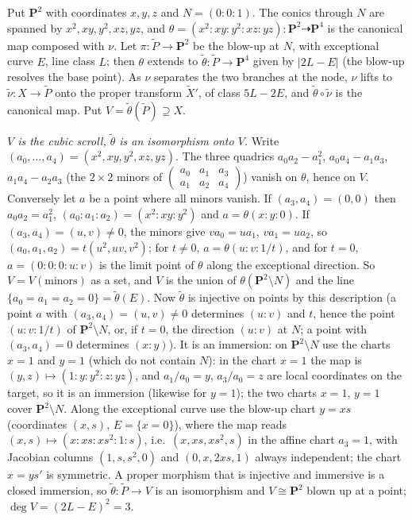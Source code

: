 \documentclass[11pt]{article}
\begin{document}
Put $\mathbf P^2$ with coordinates $x,y,z$ and $N=(0:0:1)$. The conics through $N$ are spanned by $x^2,xy,y^2,xz,yz$, and $\theta=(x^2:xy:y^2:xz:yz):\mathbf P^2\dashrightarrow\mathbf P^4$ is the canonical map composed with $\nu$. Let $\pi:\tilde P\to\mathbf P^2$ be the blow-up at $N$, with exceptional curve $E$, line class $L$; then $\theta$ extends to $\tilde\theta:\tilde P\to\mathbf P^4$ given by $|2L-E|$ (the blow-up resolves the base point). As $\nu$ separates the two branches at the node, $\nu$ lifts to $\tilde\nu:X\to\tilde P$ onto the proper transform $\tilde X'$, of class $5L-2E$, and $\tilde\theta\circ\tilde\nu$ is the canonical map. Put $V=\tilde\theta(\tilde P)\supseteq X$.

\emph{$V$ is the cubic scroll, $\tilde\theta$ is an isomorphism onto $V$.} Write $(a_0,\dots,a_4)=(x^2,xy,y^2,xz,yz)$. The three quadrics $a_0a_2-a_1^2$, $a_0a_4-a_1a_3$, $a_1a_4-a_2a_3$ (the $2\times2$ minors of $\begin{pmatrix}a_0&a_1&a_3\\a_1&a_2&a_4\end{pmatrix}$) vanish on $\theta$, hence on $V$. Conversely let $a$ be a point where all minors vanish. If $(a_3,a_4)=(0,0)$ then $a_0a_2=a_1^2$, $(a_0:a_1:a_2)=(x^2:xy:y^2)$ and $a=\theta(x:y:0)$. If $(a_3,a_4)=(u,v)\ne0$, the minors give $va_0=ua_1$, $va_1=ua_2$, so $(a_0,a_1,a_2)=t(u^2,uv,v^2)$; for $t\ne0$, $a=\theta(u:v:1/t)$, and for $t=0$, $a=(0:0:0:u:v)$ is the limit point of $\theta$ along the exceptional direction. So $V=V(\text{minors})$ as a set, and $V$ is the union of $\theta(\mathbf P^2\setminus N)$ and the line $\{a_0=a_1=a_2=0\}=\tilde\theta(E)$. Now $\tilde\theta$ is injective on points by this description (a point $a$ with $(a_3,a_4)=(u,v)\ne0$ determines $(u:v)$ and $t$, hence the point $(u:v:1/t)$ of $\mathbf P^2\setminus N$, or, if $t=0$, the direction $(u:v)$ at $N$; a point with $(a_3,a_4)=0$ determines $(x:y)$). It is an immersion: on $\mathbf P^2\setminus N$ use the charts $x=1$ and $y=1$ (which do not contain $N$): in the chart $x=1$ the map is $(y,z)\mapsto(1:y:y^2:z:yz)$, and $a_1/a_0=y$, $a_3/a_0=z$ are local coordinates on the target, so it is an immersion (likewise for $y=1$); the two charts $x=1$, $y=1$ cover $\mathbf P^2\setminus N$. Along the exceptional curve use the blow-up chart $y=xs$ (coordinates $(x,s)$, $E=\{x=0\}$), where the map reads $(x,s)\mapsto(x:xs:xs^2:1:s)$, i.e.\ $(x,xs,xs^2,s)$ in the affine chart $a_3=1$, with Jacobian columns $(1,s,s^2,0)$ and $(0,x,2xs,1)$ always independent; the chart $x=ys'$ is symmetric. A proper morphism that is injective and immersive is a closed immersion, so $\tilde\theta:\tilde P\to V$ is an isomorphism and $V\cong\mathbf P^2$ blown up at a point; $\deg V=(2L-E)^2=3$.
\end{document}
